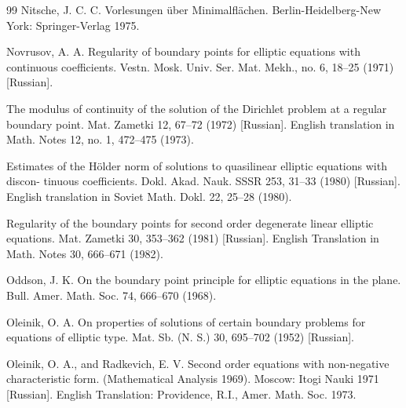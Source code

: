 \begin{thebibliography}{99}
Nitsche, J. C. C.
Vorlesungen über Minimalflächen. Berlin-Heidelberg-New York: Springer-Verlag 1975.

Novrusov, A. A.
Regularity of boundary points for elliptic equations with continuous coefficients. Vestn.
Mosk. Univ. Ser. Mat. Mekh., no. 6, 18--25 (1971) [Russian].

The modulus of continuity of the solution of the Dirichlet problem at a regular boundary
point. Mat. Zametki 12, 67--72 (1972) [Russian]. English translation in Math. Notes 12,
no. 1, 472--475 (1973).

Estimates of the Hölder norm of solutions to quasilinear elliptic equations with discon-
tinuous coefficients. Dokl. Akad. Nauk. SSSR 253, 31--33 (1980) [Russian]. English
translation in Soviet Math. Dokl. 22, 25--28 (1980).

Regularity of the boundary points for second order degenerate linear elliptic equations.
Mat. Zametki 30, 353--362 (1981) [Russian]. English Translation in Math. Notes 30,
666--671 (1982).

Oddson, J. K.
On the boundary point principle for elliptic equations in the plane. Bull. Amer. Math.
Soc. 74, 666--670 (1968).

Oleinik, O. A.
On properties of solutions of certain boundary problems for equations of elliptic type.
Mat. Sb. (N. S.) 30, 695--702 (1952) [Russian].

Oleinik, O. A., and Radkevich, E. V.
Second order equations with non-negative characteristic form. (Mathematical Analysis
1969). Moscow: Itogi Nauki 1971 [Russian]. English Translation: Providence, R.I.,
Amer. Math. Soc. 1973.

\end{thebibliography}

